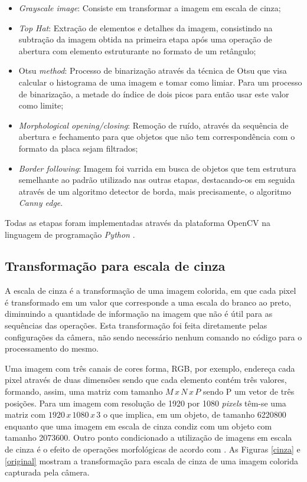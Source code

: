 \begin{itemize}
    \item \emph{Grayscale image}: Consiste em transformar a imagem em escala de cinza;
    \item \emph{Top Hat}: Extração de elementos e detalhes da imagem, consistindo na subtração da imagem obtida na primeira etapa após uma operação de abertura com elemento estruturante no formato de um retângulo;
    \item Otsu \emph{method}: Processo de binarização através da técnica de Otsu que visa calcular o histograma de uma imagem e tomar como limiar. Para um processo de binarização, a metade do índice de dois picos para então usar este valor como limite; 
    \item \emph{Morphological opening/closing}: Remoção de ruído, através da sequência de abertura e fechamento para que objetos que não tem correspondência com o formato da placa sejam filtrados; 
    \item \emph{Border following}: Imagem foi varrida em busca de objetos que tem estrutura semelhante ao padrão utilizado nas outras etapas, destacando-os em seguida através de um algoritmo detector de borda, mais precisamente, o algoritmo \emph{Canny edge}. 
\end{itemize}
    
Todas as etapas foram implementadas através da plataforma OpenCV na linguagem de programação \textit{Python} \cite{yepez2018improved}\cite{gonzalez2007digital}.


\subsection{Transformação para escala de cinza}

A escala de cinza é a transformação de uma imagem colorida, em que cada pixel é transformado em um valor que corresponde a uma escala do branco ao preto, diminuindo a quantidade de informação na imagem que não é útil para as sequências das operações. Esta transformação foi feita diretamente pelas configurações da câmera, não sendo necessário nenhum comando no código para o processamento do mesmo. 

Uma imagem com três canais de cores forma, RGB, por exemplo, endereça cada pixel através de duas dimensões sendo que cada elemento contém três valores, formando, assim, uma matriz com tamanho $M\,x\,N\,x\,P$ sendo P um vetor de três posições. Para um imagem com resolução de 1920 por 1080 \emph{pixels} têm-se uma matriz com $1920\,x\,1080\,x\,3$ o que implica, em um objeto, de tamanho 6220800 enquanto que uma imagem em escala de cinza condiz com um objeto com tamanho 2073600. Outro ponto condicionado a utilização de imagens em escala de cinza é o efeito de operações morfológicas de acordo com \cite{yepez2018improved}. As Figuras \ref{cinza} e \ref{original} mostram a transformação para escala de cinza de uma imagem colorida capturada pela câmera. 

